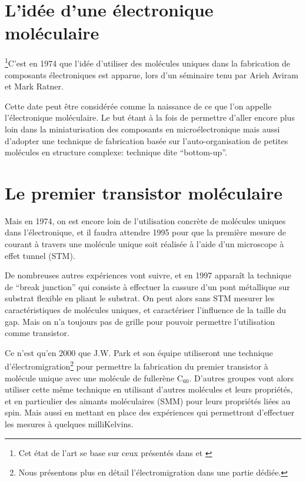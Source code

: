 \section{L'idée d'une électronique moléculaire}
\footnote{Cet état de l'art se base sur ceux présentés dans \cite{3} et \cite{4}}C'est en 1974 que l'idée d'utiliser des molécules uniques dans la fabrication de composants électroniques est apparue, lors d'un séminaire tenu par Arieh Aviram et Mark Ratner.

Cette date peut être considérée comme la naissance de ce que l'on appelle l'électronique moléculaire.
Le but étant à la fois de permettre d'aller encore plus loin dans la miniaturisation des composants en microélectronique mais aussi d'adopter une technique de fabrication basée sur l'auto-organisation de petites molécules en structure complexe: technique dite “bottom-up”.
\section{Le premier transistor moléculaire}
Mais en 1974, on est encore loin de l'utilisation concrète de molécules uniques dans l'électronique, et il faudra attendre 1995 pour que la première mesure de courant à travers une molécule unique soit réalisée à l'aide d'un microscope à effet tunnel (STM).

De nombreuses autres expériences vont suivre, et en 1997 apparaît la technique de “break junction” qui consiste à effectuer la cassure d'un pont métallique sur substrat flexible en pliant le substrat. On peut alors sans STM mesurer les caractéristiques de molécules uniques, et caractériser l'influence de la taille du gap. Mais on n'a toujours pas de grille pour pouvoir permettre l'utilisation comme transistor.

Ce n'est qu'en 2000 que J.W. Park et son équipe utiliseront une technique d'électromigration\footnote{Nous présentons plus en détail l'électromigration dans une partie dédiée.} pour permettre la fabrication du premier transistor à molécule unique avec une molécule de fullerène C$_{60}$. D'autres groupes vont alors utiliser cette même technique en utilisant d'autres molécules et leurs propriétés, et en particulier des aimants moléculaires (SMM) pour leurs propriétés liées au spin. Mais aussi en mettant en place des expériences qui permettront d'effectuer les mesures à quelques milliKelvins.

